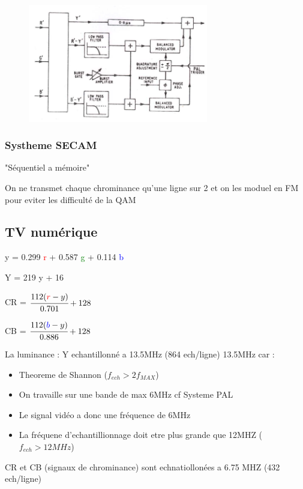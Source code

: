 \documentclass[12pt]{article}
\begin{document}
			\begin{figure}[htp]
				\centering
				\includegraphics[width=0.7\textwidth]{img/PAL1.png}
			\end{figure}
				
				
			\subsubsection{Systheme SECAM}
				"Séquentiel a mémoire"
				
				On ne transmet chaque chrominance qu'une ligne sur 2 et on les moduel en FM pour eviter les difficulté de la QAM
				
		\subsection{TV numérique}
			y = 0.299 \textcolor{red}{r} + 0.587 \textcolor{green}{g} + 0.114 \textcolor{blue}{b}
			
			Y = 219 y + 16
			
			CR = $\cfrac{112(\textcolor{red}{r} - y)}{0.701} + 128$
			
			CB = $\cfrac{112(\textcolor{blue}{b} - y)}{0.886} + 128$
			
			
			La luminance : Y echantillonné a 13.5MHz (864 ech/ligne)
			13.5MHz car :
			\begin{itemize}
				\item Theoreme de Shannon ($f_{ech} > 2 f_{MAX}$)
				\item On travaille sur une bande de max 6MHz cf Systeme PAL
				\item Le signal vidéo a donc une fréquence de 6MHz
				\item La fréquene d'echantillionnage doit etre plus grande que 12MHZ ($f_{ech} > 12MHz$)
			\end{itemize}
			
			CR et CB (signaux de chrominance) sont echnatiollonées a 6.75 MHZ (432 ech/ligne)
			
\end{document}
